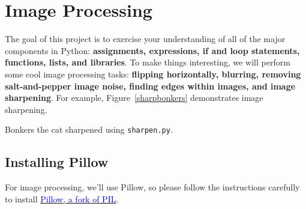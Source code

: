 \documentclass[titlepage]{tufte-book}
\newcounter{problem}
\newcommand{\figref}[1]{Figure~\ref{#1}}
\begin{document}
\chapter{Image Processing}

\setcounter{problem}{1}

\noindent The goal of this project is to exercise your understanding of all of the major components in Python: {\bf assignments, expressions, if and loop statements, functions, lists, and libraries}. To make things interesting, we will perform some cool image processing tasks: {\bf flipping horizontally, blurring, removing salt-and-pepper image noise, finding edges within images, and image sharpening}.  For example, \figref{sharpbonkers} demonstrates image sharpening.

\begin{marginfigure}
\begin{center}
\end{center}
\caption{Bonkers the cat sharpened using {\tt sharpen.py}.}
\label{sharpbonkers}
\end{marginfigure}

\section{Installing Pillow}

For image processing, we'll use Pillow, so please follow the instructions carefully to install \href{http://pillow.readthedocs.org/en/latest/installation.html}{\textcolor{blue}{Pillow, a fork of PIL}}.
\end{document}
